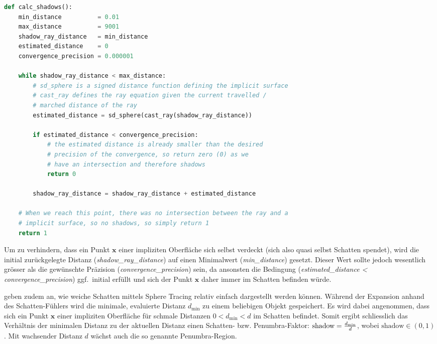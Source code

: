 \begin{lstlisting}[language=Python,caption={Algorithmus zur Berechnung
        von Schatten.},label={alg:sphere_tracing_shadows},captionpos=b,emph={calc_shadows}]
def calc_shadows():
    min_distance          = 0.01
    max_distance          = 9001
    shadow_ray_distance   = min_distance
    estimated_distance    = 0
    convergence_precision = 0.000001

    while shadow_ray_distance < max_distance:
        # sd_sphere is a signed distance function defining the implicit surface
        # cast_ray defines the ray equation given the current travelled /
        # marched distance of the ray
        estimated_distance = sd_sphere(cast_ray(shadow_ray_distance))

        if estimated_distance < convergence_precision:
            # the estimated distance is already smaller than the desired
            # precision of the convergence, so return zero (0) as we
            # have an intersection and therefore shadows
            return 0

        shadow_ray_distance = shadow_ray_distance + estimated_distance

    # When we reach this point, there was no intersection between the ray and a
    # implicit surface, so no shadows, so simply return 1
    return 1
\end{lstlisting}

Um zu verhindern, dass ein Punkt $\bm{x}$ einer impliziten Oberfläche
sich selbst verdeckt (sich also quasi selbst Schatten spendet), wird die
initial zurückgelegte Distanz (\textit{shadow\_ray\_distance}) auf einen
Minimalwert (\textit{min\_distance}) gesetzt. Dieser Wert sollte jedoch
wesentlich grösser als die gewünschte Präzision
(\textit{convergence\_precision}) sein, da ansonsten die Bedingung
(\textit{estimated\_distance < convergence\_precision}) ggf.\ initial
erfüllt und sich der Punkt $\bm{x}$ daher immer im Schatten befinden
würde.

\citeauthor{reiner_smi_2011} geben zudem an, wie weiche Schatten mittels
Sphere Tracing relativ einfach dargestellt werden können. Während der
Expansion anhand des Schatten-Fühlers wird die minimale, evaluierte
Distanz $d_{\text{min}}$ zu einem beliebigen Objekt gespeichert. Es wird
dabei angenommen, dass sich ein Punkt $\bm{x}$ einer impliziten
Oberfläche für schmale Distanzen $ 0 < d_{\text{min}} < d $ im Schatten
befindet. Somit ergibt schliesslich das Verhältnis der minimalen Distanz
zu der aktuellen Distanz einen Schatten- bzw.  Penumbra-Faktor:
$\text{shadow} = {d_{\text{min}} \over d}$, wobei $\text{shadow} \in (0,
1)$. Mit wachsender Distanz $d$ wächst auch die so genannte
Penumbra-Region.

